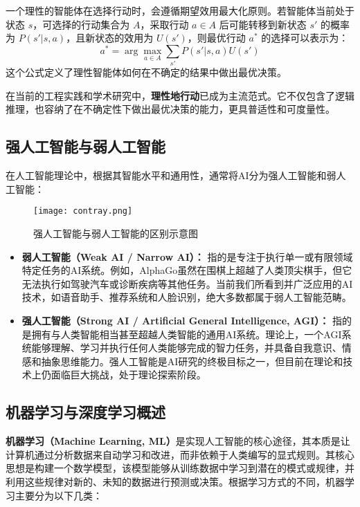 一个理性的智能体在选择行动时，会遵循期望效用最大化原则。若智能体当前处于状态 $s$，可选择的行动集合为 $A$，采取行动 $a \in A$ 后可能转移到新状态 $s'$ 的概率为 $P(s'|s, a)$，且新状态的效用为 $U(s')$，则最优行动 $a^*$ 的选择可以表示为：
$$ a^* = \arg\max_{a \in A} \sum_{s'} P(s' |s, a) U(s') $$
这个公式定义了理性智能体如何在不确定的结果中做出最优决策。

在当前的工程实践和学术研究中，\textbf{理性地行动}已成为主流范式。它不仅包含了逻辑推理，也容纳了在不确定性下做出最优决策的能力，更具普适性和可度量性。

\subsection{强人工智能与弱人工智能}
\label{ssec:strong_weak_ai}
在人工智能理论中，根据其智能水平和通用性，通常将AI分为强人工智能和弱人工智能：

\begin{figure}[H]
    \centering
    \texttt{[image: contray.png]} 
    \caption{强人工智能与弱人工智能的区别示意图}
    \label{fig:contray}
\end{figure}

\begin{itemize}
    \item \textbf{弱人工智能（Weak AI / Narrow AI）：} 指的是专注于执行单一或有限领域特定任务的AI系统。例如，AlphaGo虽然在围棋上超越了人类顶尖棋手，但它无法执行如驾驶汽车或诊断疾病等其他任务。当前我们所看到并广泛应用的AI技术，如语音助手、推荐系统和人脸识别，绝大多数都属于弱人工智能范畴。
    \item \textbf{强人工智能（Strong AI / Artificial General Intelligence, AGI）：} 指的是拥有与人类智能相当甚至超越人类智能的通用AI系统。理论上，一个AGI系统能够理解、学习并执行任何人类能够完成的智力任务，并具备自我意识、情感和抽象思维能力。强人工智能是AI研究的终极目标之一，但目前在理论和技术上仍面临巨大挑战，处于理论探索阶段。
\end{itemize}

\subsection{机器学习与深度学习概述}
\label{ssec:ml_dl_overview}
\textbf{机器学习（Machine Learning, ML）}\cite{mahesh2020machine}是实现人工智能的核心途径，其本质是让计算机通过分析数据来自动学习和改进，而非依赖于人类编写的显式规则。其核心思想是构建一个数学模型，该模型能够从训练数据中学习到潜在的模式或规律，并利用这些规律对新的、未知的数据进行预测或决策。根据学习方式的不同，机器学习主要分为以下几类：

